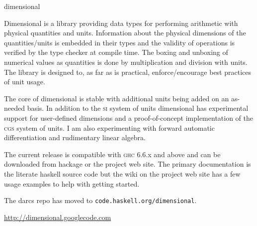 \begin{hcarentry}[updated]{dimensional}
\label{dimensional}
\makeheader

Dimensional is a library providing data types for performing
arithmetic with physical quantities and units. Information about
the physical dimensions of the quantities/units is embedded in their
types and the validity of operations is verified by the type checker
at compile time. The boxing and unboxing of numerical values as
quantities is done by multiplication and division with units. The
library is designed to, as far as is practical, enforce/encourage
best practices of unit usage.

The core of dimensional is stable with additional units being added
on an as-needed basis. In addition to the \textsc{si} system of
units dimensional has experimental support for user-defined dimensions
and a proof-of-concept implementation of the \textsc{cgs} system
of units. I am also experimenting with forward automatic differentiation
and rudimentary linear algebra.

The current release is compatible with \textsc{ghc} 6.6.x and
above and can be downloaded from hackage or the project web site.
The primary documentation is the literate haskell source code but
the wiki on the project web site has a few usage examples to help
with getting started.

The darcs repo has moved to \texttt{code.haskell.org/dimensional}.

\FurtherReading
 \url{http://dimensional.googlecode.com}
\end{hcarentry}
